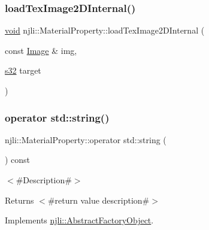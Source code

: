\subsubsection{\texorpdfstring{load\+Tex\+Image2\+D\+Internal()}{loadTexImage2DInternal()}}
{\footnotesize\ttfamily \mbox{\hyperlink{_thread_8h_af1e856da2e658414cb2456cb6f7ebc66}{void}} njli\+::\+Material\+Property\+::load\+Tex\+Image2\+D\+Internal (\begin{DoxyParamCaption}\item[{const \mbox{\hyperlink{classnjli_1_1_image}{Image}} \&}]{img,  }\item[{\mbox{\hyperlink{_util_8h_aa62c75d314a0d1f37f79c4b73b2292e2}{s32}}}]{target }\end{DoxyParamCaption})\hspace{0.3cm}{\ttfamily [protected]}}

\mbox{\label{classnjli_1_1_material_property_a3ab43fdd4f1a6dd76f5e8e468c1be923}} 
\subsubsection{\texorpdfstring{operator std\+::string()}{operator std::string()}}
{\footnotesize\ttfamily njli\+::\+Material\+Property\+::operator std\+::string (\begin{DoxyParamCaption}{ }\end{DoxyParamCaption}) const\hspace{0.3cm}{\ttfamily [virtual]}}

$<$\#\+Description\#$>$

\begin{DoxyReturn}{Returns}
$<$\#return value description\#$>$ 
\end{DoxyReturn}


Implements \mbox{\hyperlink{classnjli_1_1_abstract_factory_object_a838f4fa7e65cace6098aab5222892942}{njli\+::\+Abstract\+Factory\+Object}}.

\mbox{\label{classnjli_1_1_material_property_a2be91e903f98e3eea9309485e76a7f79}} 
